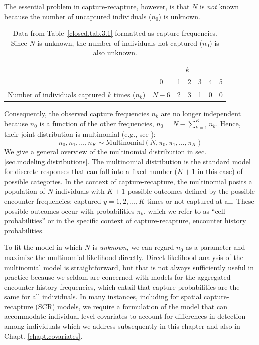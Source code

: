 The essential problem in capture-recapture, however, is that $N$ is
{\it not} known because the number of uncaptured %
individuals ($n_0$)
is unknown. %
\begin{table}
\centering
\caption{Data from Table~\ref{closed.tab.3.1} formatted as capture
  frequencies. Since $N$ is unknown, the number of individuals not
  captured ($n_0$) is also unknown.}
\begin{tabular}{lcccccc}
\hline
& \multicolumn{6}{c}{$k$} \\
\cline{2-7}
 & 0  & 1 & 2 & 3 & 4 & 5 \\
\hline
Number of individuals captured $k$ times ($n_k$) & $N-6$ & 2 & 3 & 1 & 0 & 0 \\
\hline
\end{tabular}
\label{closed.tab.3.1.nk}
\end{table}
Consequently, the observed capture frequencies $n_k$ are no
longer independent because $n_0$ is a function of the other
frequencies, $n_0 = N-\sum_{k=1}^K n_k$. Hence, their joint distribution is multinomial
(e.g., see \citet[][p. xyz]{illian_etal:2008}):
\begin{equation}
    n_0, n_1, \ldots, n_K \sim \mathrm{Multinomial}(N, \pi_0, \pi_1, \ldots, \pi_K)
\label{closed.eq.multinomial4m0}
\end{equation}
We give a general overview of the multinomial distribution in
sec. \ref{sec.modeling.distributions}. The multinomial distribution is
the standard model for discrete responses that can fall into a fixed
number ($K+1$ in this case) of possible categories. In the context of
capture-recapture, the multinomial posits a population of $N$
individuals with $K+1$ possible outcomes defined by the possible
encounter frequencies: captured $y=1,2,\ldots,K$ times or not captured
at all. These possible outcomes occur with
probabilities $\pi_{k}$, which we refer to as ``cell probabilities''
or in the specific context of capture-recapture, encounter history
probabilities.


To fit the model in which $N$ is {\it unknown}, we can regard $n_{0}$ as a
parameter and maximize the multinomial likelihood directly.
Direct likelihood analysis of the multinomial model is
straightforward, but that is not always sufficiently useful in practice
because we seldom are concerned with models for the aggregated
encounter history frequencies, which entail that capture probabilities are the
same for all individuals. In many instances, including for
spatial capture-recapture (SCR) models, we require a formulation of
the model that can accommodate individual-level
covariates to account for
differences in detection among individuals which we
address subsequently in this chapter and also in Chapt. \ref{chapt.covariates}.



